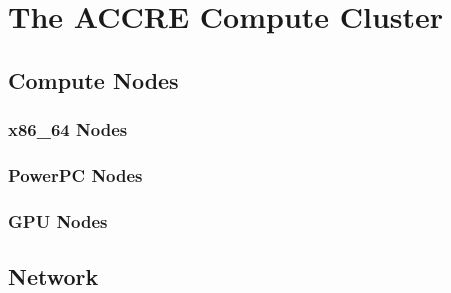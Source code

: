 
%
%

\section{The ACCRE Compute Cluster}
\label{sec:accre}





\subsection{Compute Nodes}
\label{subsec:nodes}



\subsubsection{x86_64 Nodes}
\label{subsubsec:x86_64}



\subsubsection{PowerPC Nodes}
\label{subsubsec:ppc}



\subsubsection{GPU Nodes}
\label{subsubsec:gpu}




\subsection{Network}
\label{subsec:network}





